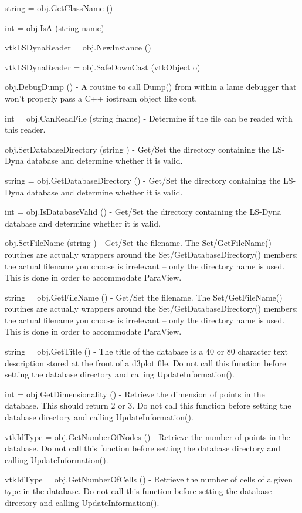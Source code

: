 \begin{DoxyItemize}
\item {\ttfamily string = obj.\-Get\-Class\-Name ()}  
\item {\ttfamily int = obj.\-Is\-A (string name)}  
\item {\ttfamily vtk\-L\-S\-Dyna\-Reader = obj.\-New\-Instance ()}  
\item {\ttfamily vtk\-L\-S\-Dyna\-Reader = obj.\-Safe\-Down\-Cast (vtk\-Object o)}  
\item {\ttfamily obj.\-Debug\-Dump ()} -\/ A routine to call Dump() from within a lame debugger that won't properly pass a C++ iostream object like cout.  
\item {\ttfamily int = obj.\-Can\-Read\-File (string fname)} -\/ Determine if the file can be readed with this reader.  
\item {\ttfamily obj.\-Set\-Database\-Directory (string )} -\/ Get/\-Set the directory containing the L\-S-\/\-Dyna database and determine whether it is valid.  
\item {\ttfamily string = obj.\-Get\-Database\-Directory ()} -\/ Get/\-Set the directory containing the L\-S-\/\-Dyna database and determine whether it is valid.  
\item {\ttfamily int = obj.\-Is\-Database\-Valid ()} -\/ Get/\-Set the directory containing the L\-S-\/\-Dyna database and determine whether it is valid.  
\item {\ttfamily obj.\-Set\-File\-Name (string )} -\/ Get/\-Set the filename. The Set/\-Get\-File\-Name() routines are actually wrappers around the Set/\-Get\-Database\-Directory() members; the actual filename you choose is irrelevant -- only the directory name is used. This is done in order to accommodate Para\-View.  
\item {\ttfamily string = obj.\-Get\-File\-Name ()} -\/ Get/\-Set the filename. The Set/\-Get\-File\-Name() routines are actually wrappers around the Set/\-Get\-Database\-Directory() members; the actual filename you choose is irrelevant -- only the directory name is used. This is done in order to accommodate Para\-View.  
\item {\ttfamily string = obj.\-Get\-Title ()} -\/ The title of the database is a 40 or 80 character text description stored at the front of a d3plot file. Do not call this function before setting the database directory and calling Update\-Information().  
\item {\ttfamily int = obj.\-Get\-Dimensionality ()} -\/ Retrieve the dimension of points in the database. This should return 2 or 3. Do not call this function before setting the database directory and calling Update\-Information().  
\item {\ttfamily vtk\-Id\-Type = obj.\-Get\-Number\-Of\-Nodes ()} -\/ Retrieve the number of points in the database. Do not call this function before setting the database directory and calling Update\-Information().  
\item {\ttfamily vtk\-Id\-Type = obj.\-Get\-Number\-Of\-Cells ()} -\/ Retrieve the number of cells of a given type in the database. Do not call this function before setting the database directory and calling Update\-Information().


\end{DoxyItemize}
